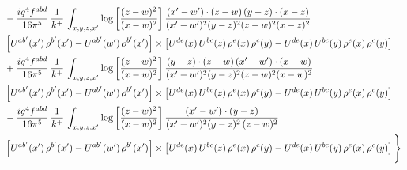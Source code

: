 \documentclass[10pt]{article}
\begin{document}
{\begin{align*}
& -\frac{ig^{4}f^{abd}}{16\pi^{5}}\,\frac{1}{k^{+}}\,\int_{x,y,z,x'}\log{\left[\frac{(z-w)^{2}}{(x-w)^{2}}\right]}\,
\frac{(x'-w')\cdot(z-w)\,(y-z)\cdot(x-z)}{(x'-w')^{2}(y-z)^{2}(z-w)^{2}(x-z)^{2}}\notag \\
&\left[U^{ab'}(x')\,\rho^{b'}(x')-U^{ab'}(w')\, \rho^{b'}(x')\right]\times \left[U^{de}(x)\,U^{bc}(z)\, \rho^{e}(x)\,\rho^{c}(y)-U^{de}(x)\,U^{bc}(y)\,\rho^{e}(x)\,\rho^{c}(y)\right] \notag \\
&+ \frac{ig^{4}f^{abd}}{16\pi^{5}}\,\frac{1}{k^{+}}\,\int_{x,y,z,x'}\log{\left[\frac{(z-w)^{2}}{(x-w)^{2}}\right]}\,
\frac{(y-z)\cdot(z-w)\,(x'-w')\cdot(x-w)}{(x'-w')^{2}(y-z)^{2}(z-w)^{2}(x-w)^{2}}\notag \\ 
& \left[U^{ab'}(x')\,\rho^{b'}(x')-U^{ab'}(w')\, \rho^{b'}(x')\right]\times \left[U^{de}(x)\,U^{bc}(z)\, \rho^{e}(x)\,\rho^{c}(y)-U^{de}(x)\,U^{bc}(y)\,\rho^{e}(x)\,\rho^{c}(y)\right]\notag \\ &  -\frac{ig^{4}f^{abd}}{16\pi^{5}}\,\frac{1}{k^{+}}\,\int_{x,y,z,x'}\log{\left[\frac{(z-w)^{2}}{(x-w)^{2}}\right]}\,\frac{(x'-w')\cdot(y-z)}{(x'-w')^{2}(y-z)^{2}\,(z-w)^{2}}\notag \\ & \left[U^{ab'}(x')\,\rho^{b'}(x')-U^{ab'}(w')\, \rho^{b'}(x')\right]\times \left[U^{de}(x)\,U^{bc}(z)\, \rho^{e}(x)\,\rho^{c}(y)-U^{de}(x)\,U^{bc}(y)\,\rho^{e}(x)\,\rho^{c}(y)\right]\Bigg\}
\end{align*}}\par
\end{document}
